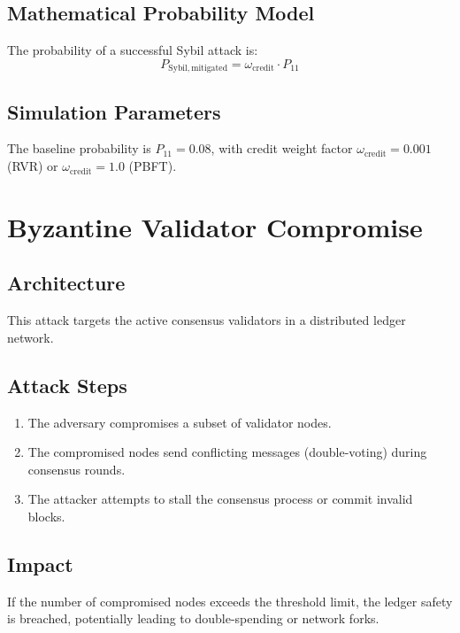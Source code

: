 \documentclass[12pt, oneside, a4paper]{report}
\theoremstyle{definition}
\theoremstyle{remark}
\begin{document}
\subsection{Mathematical Probability Model}
The probability of a successful Sybil attack is:
\begin{equation}
P_{\mathrm{Sybil,mitigated}} = \omega_{\mathrm{credit}} \cdot P_{11}
\end{equation}

\subsection{Simulation Parameters}
The baseline probability is $P_{11} = 0.08$, with credit weight factor $\omega_{\mathrm{credit}} = 0.001$ (RVR) or $\omega_{\mathrm{credit}} = 1.0$ (PBFT).

\bigskip

\section{Byzantine Validator Compromise}
\label{sec:tm:byz_compromise}

\subsection{Architecture}
This attack targets the active consensus validators in a distributed ledger network.

\subsection{Attack Steps}
\begin{enumerate}
  \item The adversary compromises a subset of validator nodes.
  \item The compromised nodes send conflicting messages (double-voting) during consensus rounds.
  \item The attacker attempts to stall the consensus process or commit invalid blocks.
\end{enumerate}

\subsection{Impact}
If the number of compromised nodes exceeds the threshold limit, the ledger safety is breached, potentially leading to double-spending or network forks.
\end{document}
